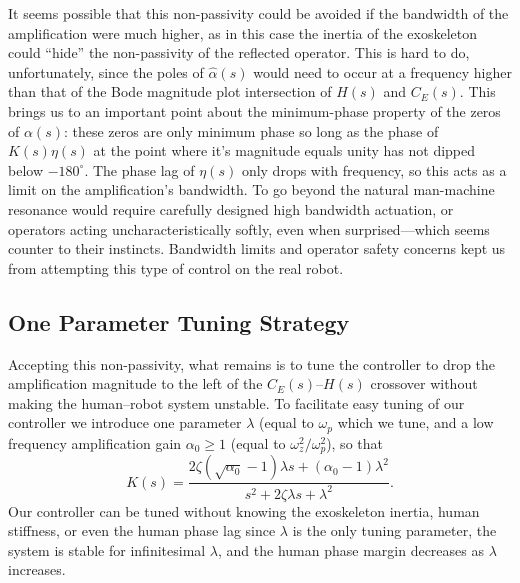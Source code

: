 It seems possible that this non-passivity could be avoided if the bandwidth of the amplification were much higher, as in this case the inertia of the exoskeleton could ``hide'' the non-passivity of the reflected operator. This is hard to do, unfortunately, since the poles of $\hat\alpha(s)$ would need to occur at a frequency higher than that of the Bode magnitude plot intersection of $H(s)$ and $C_E(s)$. This brings us to an important point about the minimum-phase property of the zeros of $\alpha(s)$: these zeros are only minimum phase so long as the phase of $K(s)\eta(s)$ at the point where it's magnitude equals unity has not dipped below $-180^\circ$. The phase lag of $\eta(s)$ only drops with frequency, so this acts as a limit on the amplification's bandwidth. To go beyond the natural man-machine resonance would require carefully designed high bandwidth actuation, or operators acting uncharacteristically softly, even when surprised---which seems counter to their instincts.
Bandwidth limits and operator safety concerns kept us from attempting this type of control on the real robot.

\subsection{One Parameter Tuning Strategy}
Accepting this non-passivity, what remains is to tune the controller to drop the amplification magnitude to the left of the $C_E(s)$--$H(s)$ crossover without making the human--robot system unstable. 
To facilitate easy tuning of our controller we introduce one parameter $\lambda$ (equal to $\omega_p$ which we tune, and a low frequency amplification gain $\alpha_0\geq1$ (equal to $\omega_z^2/\omega_p^2$), so that
\begin{equation}
K(s) = \frac{2\zeta (\sqrt{\alpha_0}-1)\lambda s + (\alpha_0-1)\lambda^2}{s^2 + 2\zeta \lambda s + \lambda^2}.
\end{equation}
Our controller can be tuned without knowing the exoskeleton inertia, human stiffness, or even the human phase lag since $\lambda$  is the only tuning parameter, the system is stable for infinitesimal $\lambda$, and the human phase margin decreases as $\lambda$ increases.


